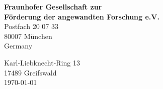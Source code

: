 \documentclass[11pt,a4paper]{moderncv}
\begin{document}
	\vspace*{1.0cm}
	\begin{minipage}{0.6\textwidth}
		\begin{flushleft}
			{\bfseries{\color{firstnamecolor}%
				 	Fraunhofer Gesellschaft zur\\[0.1cm]%
					Förderung der angewandten Forschung e.V.
			}}\\[0.2cm]
			Postfach 20 07 33\\
			80007 München\\
			Germany\\
		\end{flushleft}
	\end{minipage}
	\hfill
	\begin{minipage}{0.3\textwidth}
		\begin{flushright}
			\vspace*{1.3cm}
			Karl-Liebknecht-Ring 13\\
			17489 Greifswald\\[1.0cm]
			\today
		\end{flushright}
	\end{minipage}
	
\end{document}
